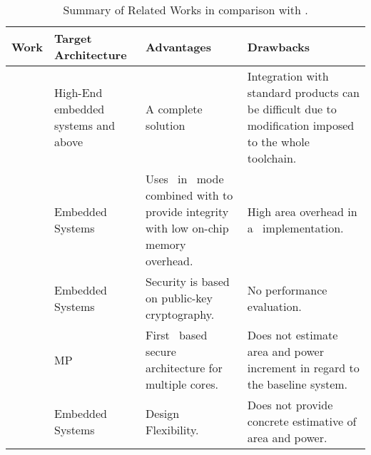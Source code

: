 \begin{table*}[!b]
	\center
	\caption{Summary of Related Works in comparison with \cshia.}
	\label{tab:related-work}
	\footnotesize
	\begin{tabular}{cp{1in}p{2in}p{2in}}

		\hline
			Work & Target Architecture & Advantages & Drawbacks \\	
		\hline
		\hline
			\aegis\cite{Suh2005} & High-End embedded systems and above & A complete solution & Integration with standard products can be difficult due to modification imposed to the whole toolchain. \\
		\hline
			\cite{Vaslin2009:OTP} & Embedded Systems & Uses \aes~in \otp~mode combined with \crc32 to provide integrity with low on-chip memory overhead. & High area overhead in a \fpga~implementation. \\
		\hline
			\cite{Bobade2015:SecurityFPGA} & Embedded Systems & Security is based on public-key cryptography. & No performance evaluation.\\
		\hline
			\cite{Sepulveda2018:CSHIA} & MP\soc & First \puf~based secure architecture for multiple cores. & Does not estimate area and power increment in regard to the baseline system.\\
		\hline
			\cshia & Embedded Systems & Design Flexibility. & Does not provide concrete estimative of area and power. \\
		\hline
	\end{tabular}
\end{table*}